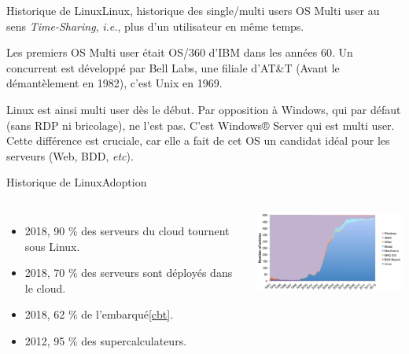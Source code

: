 \documentclass{beamer}
\begin{document}
    \begin{frame}{Historique de Linux}{Linux, historique des single/multi users OS}
        Multi user au sens \textit{Time-Sharing}, \textit{i.e.}, plus d'un utilisateur en même temps.

        Les premiers OS Multi user était OS/360 d'IBM dans les années 60.
        Un concurrent est développé par Bell Labs, une filiale d'AT\&T (Avant le démantèlement en 1982), c'est Unix en 1969.

        Linux est ainsi multi user dès le début.
        Par opposition à Windows, qui par défaut (sans RDP ni bricolage), ne l'est pas.
        C'est Windows® Server qui est multi user.
        \bigbreak
        Cette différence est cruciale, car elle a fait de cet OS un candidat idéal pour les serveurs (Web, BDD, \textit{etc}).
    \end{frame}

    \begin{frame}{Historique de Linux}{Adoption}
        \begin{columns}
            \begin{itemize}
                \item 2018, 90 \% des serveurs du cloud tournent sous Linux\footnotemark.
                \item 2018, 70 \% des serveurs sont déployés dans le cloud\footnotemark.
                \item 2018, 62 \% de l'embarqué\cref{cbt}.
                \item 2012, 95 \% des supercalculateurs\footnotemark.
            \end{itemize}
            \centering
            \includegraphics[width=6cm]{image/linux-supercomputer-growth}
        \end{columns}
    \end{frame}
\end{document}
